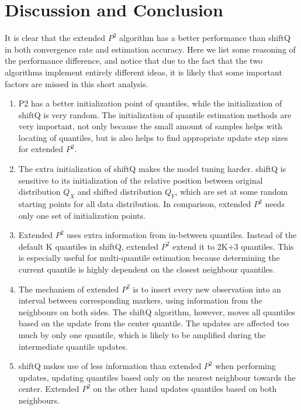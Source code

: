 \section{Discussion and Conclusion}
\label{sec: multi_discussion}
It is clear that the extended $P^2$ algorithm has a better performance than shiftQ in both convergence rate and estimation accuracy. Here we list some reasoning of the performance difference, and notice that due to the fact that the two algorithms implement entirely different ideas, it is likely that some important factors are missed in this short analysis.
\begin{enumerate}
    \item  P2 has a better initialization point of quantiles, while the initialization of shiftQ is very random. The initialization of quantile estimation methods are very important, not only because the small amount of samples helps with locating of quantiles, but is also helps to find appropriate update step sizes for extended $P^2$.
    \item The extra initialization of shiftQ makes the model tuning harder. shiftQ is sensitive to its initialization of the relative position between original distribution $Q_X$ and shifted distribution $Q_Y$, which are set at some random starting points for all data distribution. In comparison,  extended $P^2$ needs only one set of initialization points.
    \item Extended $P^2$ uses extra information from in-between quantiles. Instead of the default K quantiles in shiftQ, extended $P^2$ extend it to 2K+3 quantiles. This is especially useful for multi-quantile estimation because determining the current quantile is highly dependent on the closest neighbour quantiles.
    \item The mechanism of extended $P^2$ is to insert every new observation into an interval between corresponding markers, using information from the neighbours on both sides. The shiftQ algorithm, however, moves all quantiles based on the update from the center quantile. The updates are affected too much by only one quantile, which is likely to be amplified during the intermediate quantile updates.
    \item shiftQ mskes use of less information than extended $P^2$ when performing updates, updating quantiles based only on the nearest neighbour towards the center. Extended $P^2$ on the other hand updates quantiles based on both neighbours.
\end{enumerate}

